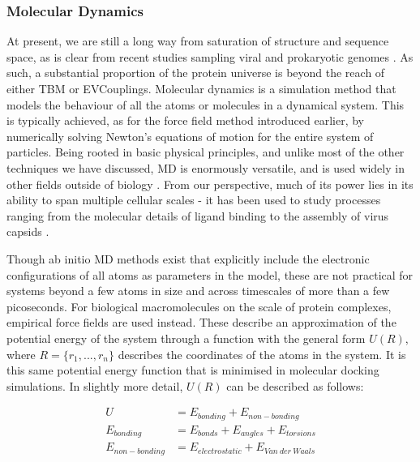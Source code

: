 \documentclass[a4paper,11pt,twoside,openright]{scrbook}
\begin{document}
\subsubsection{Molecular Dynamics}
At present, we are still a long way from saturation of structure and sequence space, as is clear from recent studies sampling viral and prokaryotic genomes \cite{Brum2016,Shi2016,Mukherjee2017}. As such, a substantial proportion of the protein universe is beyond the reach of either TBM or EVCouplings. Molecular dynamics is a simulation method that models the behaviour of all the atoms or molecules in a dynamical system. This is typically achieved, as for the force field method introduced earlier, by numerically solving Newton's equations of motion for the entire system of particles. Being rooted in basic physical principles, and unlike most of the other techniques we have discussed, MD is enormously versatile, and is used widely in other fields outside of biology \cite{Hu2013,Rapaport2014,Shao2015}. From our perspective, much of its power lies in its ability to span multiple cellular scales - it has been used to study processes ranging from the molecular details of ligand binding to the assembly of virus capsids \cite{Buch2011,Zhao2013}.

Though ab initio MD methods exist that explicitly include the electronic configurations of all atoms as parameters in the model, these are not practical for systems beyond a few atoms in size and across timescales of more than a few picoseconds. For biological macromolecules on the scale of protein complexes, empirical force fields are used instead. These describe an approximation of the potential energy of the system through a function with the general form $ U(R) $, where $ R = \{r_{1}, ..., r_{n}\} $ describes the coordinates of the atoms in the system. It is this same potential energy function that is minimised in molecular docking simulations. In slightly more detail, $ U(R) $ can be described as follows:

\begin{align*}
    U &= E_{bonding} + E_{non-bonding}\\
    E_{bonding} &= E_{bonds} + E_{angles} + E_{torsions}\\
    E_{non-bonding} &= E_{electrostatic} + E_{Van\ der\ Waals}
\end{align*}
\end{document}
